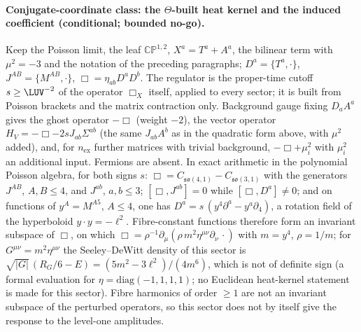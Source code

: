 \paragraph{Conjugate-coordinate class: the \(\Theta\)-built heat kernel and the induced coefficient (conditional; bounded no-go).}
Keep the Poisson limit, the leaf \(\mathbb{CP}^{1,2}\), \(X^a=T^a+A^a\), the bilinear term with \(\mu^2=-3\) and the notation of the preceding paragraphs; \(D^a=\{T^a,\cdot\}\), \(J^{AB}=\{M^{AB},\cdot\}\), \(\Box=\eta_{ab}D^aD^b\). The regulator is the proper-time cutoff \(s\ge\LUV^{-2}\) of the operator \(\Box_X\) itself, applied to every sector; it is built from Poisson brackets and the matrix contraction only. Background gauge fixing \(D_aA^a\) gives the ghost operator \(-\Box\) (weight \(-2\)), the vector operator \(H_V=-\Box-2sJ_{ab}\Sigma^{ab}\) (the same \(J_{ab}A^b\) as in the quadratic form above, with \(\mu^2\) added), and, for \(n_{\mathrm{ex}}\) further matrices with trivial background, \(-\Box+\mu_i^2\) with \(\mu_i^2\) an additional input. Fermions are absent. In exact arithmetic in the polynomial Poisson algebra, for both signs \(s\): \(\Box=C_{\mathfrak{so}(4,1)}-C_{\mathfrak{so}(3,1)}\) with the generators \(J^{AB}\), \(A,B\le4\), and \(J^{ab}\), \(a,b\le3\); \([\Box,J^{ab}]=0\) while \([\Box,D^a]\ne0\); and on functions of \(y^A=M^{A5}\), \(A\le4\), one has \(D^a=s\,(y^4\partial^a-y^a\partial_4)\), a rotation field of the hyperboloid \(y\cdot y=-\ell^2\). Fibre-constant functions therefore form an invariant subspace of \(\Box\), on which \(\Box=\rho^{-1}\partial_\mu(\rho\,m^2\eta^{\mu\nu}\partial_\nu\,\cdot)\) with \(m=y^4\), \(\rho=1/m\); for \(G^{\mu\nu}=m^2\eta^{\mu\nu}\) the Seeley--DeWitt density of this sector is \(\sqrt{|G|}\,(R_G/6-E)=(5m^2-3\ell^2)/(4m^6)\), which is not of definite sign (a formal evaluation for \(\eta=\mathrm{diag}(-1,1,1,1)\); no Euclidean heat-kernel statement is made for this sector). Fibre harmonics of order \(\ge1\) are not an invariant subspace of the perturbed operators, so this sector does not by itself give the response to the level-one amplitudes.


